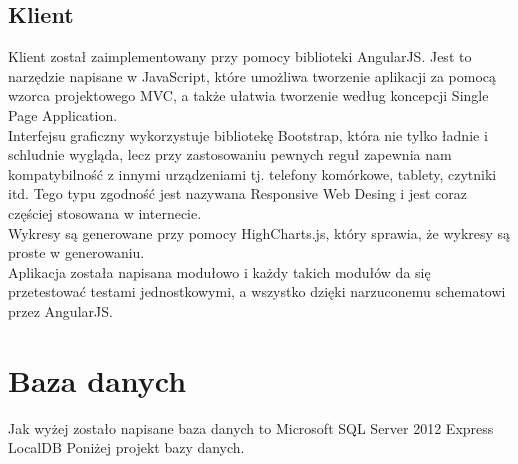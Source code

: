 \documentclass[10pt,titlepage]{article}
\begin{document}
\subsection{Klient}
Klient został zaimplementowany przy pomocy biblioteki AngularJS. Jest to narzędzie napisane w JavaScript, które umożliwa tworzenie aplikacji za pomocą wzorca projektowego MVC, a także ułatwia tworzenie według koncepcji Single Page Application.\\ Interfejsu graficzny wykorzystuje bibliotekę Bootstrap, która nie tylko ładnie i schludnie wygląda, lecz przy zastosowaniu pewnych reguł zapewnia nam kompatybilność z innymi urządzeniami tj. telefony komórkowe, tablety, czytniki itd. Tego typu zgodność jest nazywana Responsive Web Desing i jest coraz częściej stosowana w internecie.\\ Wykresy są generowane przy pomocy HighCharts.js, który sprawia, że wykresy są proste w generowaniu.\\ Aplikacja została napisana modułowo i każdy takich modułów da się przetestować testami jednostkowymi, a wszystko dzięki narzuconemu schematowi przez AngularJS.
\section{Baza danych}
Jak wyżej zostało napisane baza danych to Microsoft SQL Server 2012 Express LocalDB
Poniżej projekt bazy danych.
\end{document}
